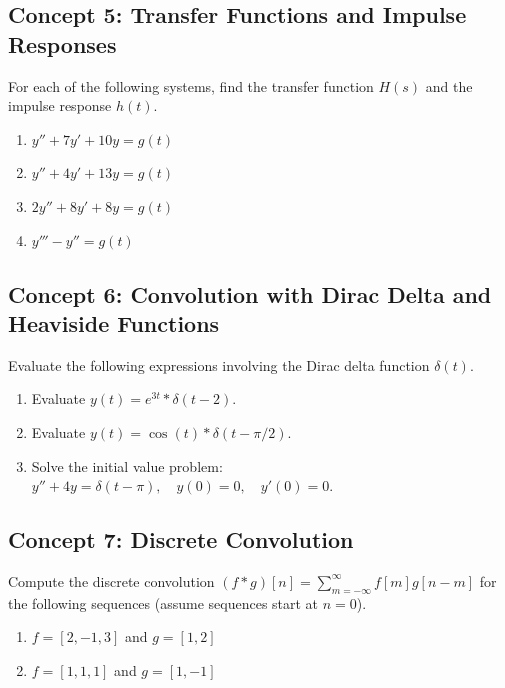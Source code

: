 \documentclass[11pt, letterpaper]{article}
\theoremstyle{definition}
\theoremstyle{remark}
\begin{document}
\subsection{Concept 5: Transfer Functions and Impulse Responses}
For each of the following systems, find the transfer function $H(s)$ and the impulse response $h(t)$.
\begin{enumerate}[label=\textbf{\arabic*.}, resume]
    \item $y'' + 7y' + 10y = g(t)$
    \item $y'' + 4y' + 13y = g(t)$
    \item $2y'' + 8y' + 8y = g(t)$
    \item $y''' - y'' = g(t)$
\end{enumerate}

\subsection{Concept 6: Convolution with Dirac Delta and Heaviside Functions}
Evaluate the following expressions involving the Dirac delta function $\delta(t)$.
\begin{enumerate}[label=\textbf{\arabic*.}, resume]
    \item Evaluate $y(t) = e^{3t} * \delta(t-2)$.
    \item Evaluate $y(t) = \cos(t) * \delta(t-\pi/2)$.
    \item Solve the initial value problem: $y'' + 4y = \delta(t-\pi), \quad y(0) = 0, \quad y'(0) = 0$.
\end{enumerate}

\subsection{Concept 7: Discrete Convolution}
Compute the discrete convolution $(f * g)[n] = \sum_{m=-\infty}^{\infty} f[m]g[n-m]$ for the following sequences (assume sequences start at $n=0$).
\begin{enumerate}[label=\textbf{\arabic*.}, resume]
    \item $f = [2, -1, 3]$ and $g = [1, 2]$
    \item $f = [1, 1, 1]$ and $g = [1, -1]$
\end{enumerate}
\end{document}

